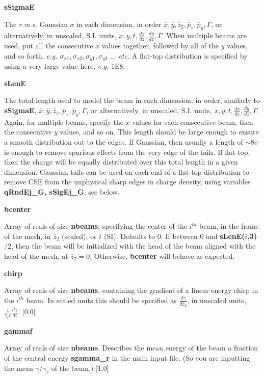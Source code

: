 \documentclass[12pt]{article}%
\begin{document}
{\bf sSigmaE}

The \textit{r.m.s.} Gaussian $\sigma$ in each dimension, in order $\bar{x}, \bar{y}, \bar{z}_2, \bar{p}_x, \bar{p}_y, \Gamma$, or alternatively, in unscaled, S.I. units, $x,y,t,\frac{dx}{dz}, \frac{dy}{dz}, \Gamma$. When multiple beams are used, put all the consecutive $x$ values together, followed by all of the $y$ values, and so forth, \textit{e.g.} $\sigma_{x1}, \sigma_{x2}, \sigma_{y1}, \sigma_{y2}$ ... \textit{etc.} A flat-top distribution is specified by using a very large value here, \textit{e.g.} 1E8.

{\bf sLenE}

The total length used to model the beam in each dimension, in order, similarly to {\bf sSigmaE}, $\bar{x}, \bar{y}, \bar{z}_2, \bar{p}_x, \bar{p}_y, \Gamma$, or alternatively, in unscaled, S.I. units, $x,y,t,\frac{dx}{dz}, \frac{dy}{dz}, \Gamma$. Again, for multiple beams, specify the $x$ values for each consecutive beam, then the consecutive $y$ values, and so on. This length should be large enough to ensure a smooth distribution out to the edges. If Gaussian, then usually a length of $\sim 8\sigma$ is enough to remove spurious effects from the very edge of the tails. If flat-top, then the charge will be equally distributed over this total length in a given dimension. Gaussian tails can be used on each end of a flat-top distribution to remove CSE from the unphysical sharp edges in charge density, using variables {\bf qRndEj\_G, sSigEj\_G}, see below.

{\bf bcenter}

Array of reals of size {\bf nbeams}, specifying the center of the $i^{th}$ beam, in the frame of the mesh, in $\bar{z}_2$ (scaled), or $t$ (SI). Defaults to 0. If between $0$ and {\bf sLenE($i$,3)} $/ 2$, then the beam will be initialized with the head of the beam aligned with the head of the mesh, at $\bar{z}_2 = 0$. Otherwise, {\bf bcenter} will behave as expected.


{\bf chirp}

Array of reals of size {\bf nbeams}, containing the gradient of a linear energy chirp in the $i^{th}$ beam. In scaled units this should be specified as $\frac{d\gamma}{d\bar{z}_2}$, in unscaled units, $\frac{1}{\gamma_r c} \frac{d\gamma}{dt}$. [0.0]


{\bf gammaf}

Array of reals of size {\bf nbeams}. Describes the mean energy of the beam a fraction of the central energy {\bf sgamma\_r} in the main input file. (So you are inputting the mean $\gamma / \gamma_r$ of the beam.) [$1.0$]
\end{document}
